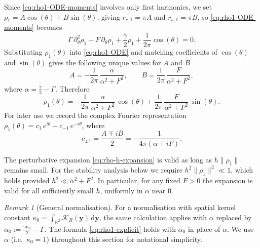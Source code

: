 \documentclass[a4paper,11pt]{article}
\theoremstyle{plain}
\theoremstyle{definition}
\theoremstyle{remark}
\newtheorem{rem}[thm]{Remark}
\newcommand{\R}{\mathbb{R}}
\newcommand{\dd}{\,\mathrm{d}}
\newcommand{\cKr}{\mathcal{K}_R}
\newcommand{\by}{\mathbf{y}}
\begin{document}
Since \eqref{eq:rho1-ODE-moments} involves only first harmonics, we set $\rho_1 = A\cos(\theta) + B\sin(\theta)$, giving $r_{c,1} = \pi A$ and $r_{s,1} = \pi B$, so \eqref{eq:rho1-ODE-moments} becomes
\begin{equation}\label{eq:rho1-ODE}
    \Gamma\,\partial_\theta^2\rho_1
    - F\,\partial_\theta\rho_1
    + \frac{\gamma}{2}\rho_1
    + \frac{1}{2\pi}\cos(\theta) = 0.
\end{equation}
Substituting $\rho_1(\theta)$ into \eqref{eq:rho1-ODE} and matching coefficients of $\cos(\theta)$ and $\sin(\theta)$ gives the following unique values for $A$ and $B$
\begin{equation*}\label{eq:AB-coeffs}
    A = -\frac{1}{2\pi}\,\frac{\alpha}{\alpha^2 + F^2}, \qquad
    B = \frac{1}{2\pi}\,\frac{F}{\alpha^2 + F^2},
\end{equation*}
where $\alpha = \frac{\gamma}{2} - \Gamma$. Therefore
\begin{equation}\label{eq:rho1-explicit}
    \rho_1(\theta) = -\frac{1}{2\pi}\,\frac{\alpha}{\alpha^2 + F^2}\,\cos(\theta)
    + \frac{1}{2\pi}\,\frac{F}{\alpha^2 + F^2}\,\sin(\theta).
\end{equation}
For later use we record the complex Fourier representation $\rho_1(\theta) = c_1\,e^{i\theta} + c_{-1}\,e^{-i\theta}$, where
\begin{equation}\label{eq:c-pm1}
    c_{\pm 1} = \frac{A \mp iB}{2} = -\frac{1}{4\pi(\alpha \mp iF)}.
\end{equation}

The perturbative expansion \eqref{eq:rho-h-expansion} is valid as long as $h\|\rho_1\|$ remains small. For the stability analysis below we require $h^2\|\rho_1\|^2 \ll 1$, which holds provided $h^2 \ll \alpha^2 + F^2$. In particular, for any fixed $F > 0$ the expansion is valid for all sufficiently small $h$, uniformly in $\alpha$ near $0$.

\begin{rem}[General normalisation]\label{rem:general-kappa}
For a normalisation with spatial kernel constant $\kappa_0 = \int_{\R^2}\cKr(\by)\dd\by$, the same calculation applies with $\alpha$ replaced by $\alpha_0 := \frac{\gamma\kappa_0}{2} - \Gamma$. The formula \eqref{eq:rho1-explicit} holds with $\alpha_0$ in place of $\alpha$. We use $\alpha$ (i.e.\ $\kappa_0 = 1$) throughout this section for notational simplicity.
\end{rem}
\end{document}
